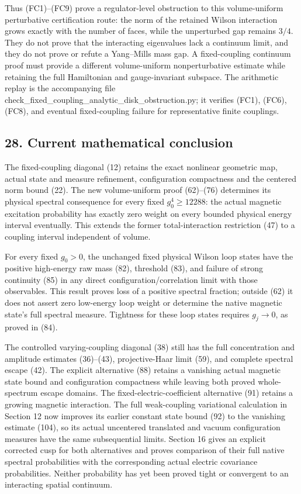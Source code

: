 \documentclass[
  11pt,
]{article}
\begin{document}
Thus (FC1)--(FC9) prove a regulator-level obstruction to this
volume-uniform perturbative certification route: the norm of the
retained Wilson interaction grows exactly with the number of faces,
while the unperturbed gap remains \(3/4\). They do not prove that the
interacting eigenvalues lack a continuum limit, and they do not prove or
refute a Yang--Mills mass gap. A fixed-coupling continuum proof must
provide a different volume-uniform nonperturbative estimate while
retaining the full Hamiltonian and gauge-invariant subspace. The
arithmetic replay is the accompanying file
check\_fixed\_coupling\_analytic\_disk\_obstruction.py; it verifies
(FC1), (FC6), (FC8), and eventual fixed-coupling failure for
representative finite couplings.

\subsection{28. Current mathematical
conclusion}\label{current-mathematical-conclusion}

The fixed-coupling diagonal (12) retains the exact nonlinear geometric
map, actual state and measure refinement, configuration compactness and
the centered norm bound (22). The new volume-uniform proof (62)--(76)
determines its physical spectral consequence for every fixed
\(g_0^4\ge12288\): the actual magnetic excitation probability has
exactly zero weight on every bounded physical energy interval
eventually. This extends the former total-interaction restriction (47)
to a coupling interval independent of volume.

For every fixed \(g_0>0\), the unchanged fixed physical Wilson loop
states have the positive high-energy raw mass (82), threshold (83), and
failure of strong continuity (85) in any direct
configuration/correlation limit with those observables. This result
proves loss of a positive spectral fraction; outside (62) it does not
assert zero low-energy loop weight or determine the native magnetic
state's full spectral measure. Tightness for these loop states requires
\(g_j\to0\), as proved in (84).

The controlled varying-coupling diagonal (38) still has the full
concentration and amplitude estimates (36)--(43), projective-Haar limit
(59), and complete spectral escape (42). The explicit alternative (88)
retains a vanishing actual magnetic state bound and configuration
compactness while leaving both proved whole-spectrum escape domains. The
fixed-electric-coefficient alternative (91) retains a growing magnetic
interaction. The full weak-coupling variational calculation in Section
12 now improves its earlier constant state bound (92) to the vanishing
estimate (104), so its actual uncentered translated and vacuum
configuration measures have the same subsequential limits. Section 16
gives an explicit corrected cusp for both alternatives and proves
comparison of their full native spectral probabilities with the
corresponding actual electric covariance probabilities. Neither
probability has yet been proved tight or convergent to an interacting
spatial continuum.
\end{document}

